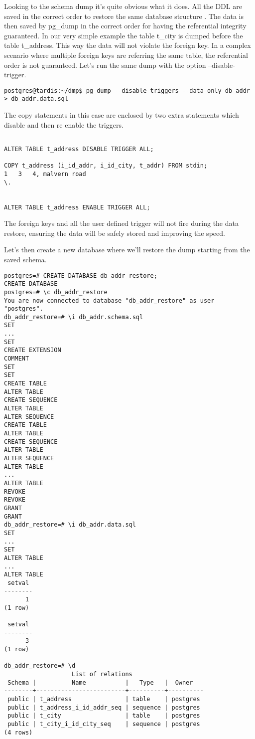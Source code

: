 Looking to the schema dump it's quite obvious what it does. All the DDL are saved in the correct 
order to restore the same database structure .\newline
The data is then saved by pg\_dump in the correct order for having the referential integrity 
guaranteed. In our very simple example the table t\_city is dumped before the table t\_address. 
This way the data will not violate the foreign key. In a complex scenario where multiple foreign keys are 
referring the same table, the referential order is not guaranteed. Let's run the same 
dump with the option --disable-trigger.

\begin{verbatim}
postgres@tardis:~/dmp$ pg_dump --disable-triggers --data-only db_addr > db_addr.data.sql

\end{verbatim}

The copy statements in this case are enclosed by two extra statements which disable and then re enable the 
triggers.

\begin{lstlisting}[style=pgsql]

ALTER TABLE t_address DISABLE TRIGGER ALL;

COPY t_address (i_id_addr, i_id_city, t_addr) FROM stdin;
1	3	4, malvern road 
\.


ALTER TABLE t_address ENABLE TRIGGER ALL;

\end{lstlisting}

The foreign keys and all the user defined trigger will not fire during the data restore, ensuring 
the data will be safely stored and improving the speed.\newline

Let's then create a new database where we'll restore the dump starting from the saved schema.

\begin{lstlisting}[style=pgsql]
postgres=# CREATE DATABASE db_addr_restore;
CREATE DATABASE
postgres=# \c db_addr_restore 
You are now connected to database "db_addr_restore" as user "postgres".
db_addr_restore=# \i db_addr.schema.sql 
SET
...
SET
CREATE EXTENSION
COMMENT
SET
SET
CREATE TABLE
ALTER TABLE
CREATE SEQUENCE
ALTER TABLE
ALTER SEQUENCE
CREATE TABLE
ALTER TABLE
CREATE SEQUENCE
ALTER TABLE
ALTER SEQUENCE
ALTER TABLE
...
ALTER TABLE
REVOKE
REVOKE
GRANT
GRANT
db_addr_restore=# \i db_addr.data.sql 
SET
...
SET
ALTER TABLE
...
ALTER TABLE
 setval 
--------
      1
(1 row)

 setval 
--------
      3
(1 row)

db_addr_restore=# \d
                   List of relations
 Schema |          Name           |   Type   |  Owner   
--------+-------------------------+----------+----------
 public | t_address               | table    | postgres
 public | t_address_i_id_addr_seq | sequence | postgres
 public | t_city                  | table    | postgres
 public | t_city_i_id_city_seq    | sequence | postgres
(4 rows)

\end{lstlisting}



